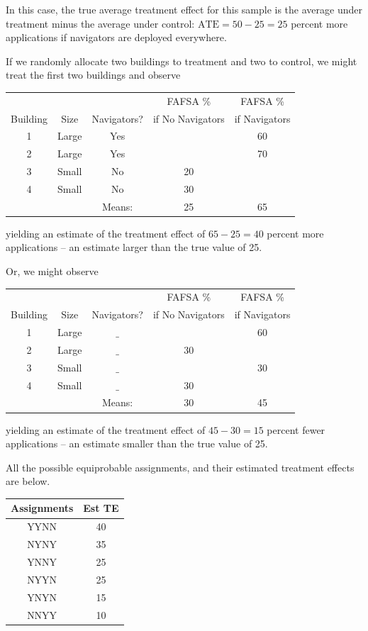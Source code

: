 \documentclass[
  12pt,
]{book}
\theoremstyle{definition}
\theoremstyle{definition}
\theoremstyle{definition}
\theoremstyle{remark}
\begin{document}
In this case, the true average treatment effect for this sample is the
average under treatment minus the average under control:
\(\text{ATE} = 50-25=25\) percent more applications if navigators are
deployed everywhere.

If we randomly allocate two buildings to treatment and two to control,
we might treat the first two buildings and observe

\begin{center}
\begin{tabular}{ccccc}
&&& FAFSA \% & FAFSA \% \\
Building & Size & Navigators? & if No Navigators & if Navigators   \\ \hline
1 & Large & Yes &  & 60 \\
2 & Large & Yes &  & 70 \\
3 & Small & No & 20 &  \\
4 & Small & No & 30 &  \\ \hline
&& Means: & 25 & 65 \\
\end{tabular}
\end{center}

yielding an estimate of the treatment effect of \(65-25 = 40\) percent
more applications -- an estimate larger than the true value of 25.

Or, we might observe

\begin{center}
\begin{tabular}{ccccc}
&&& FAFSA \% & FAFSA \% \\
Building & Size & Navigators? & if No Navigators & if Navigators   \\ \hline
1 & Large & $\_$ &  & 60 \\
2 & Large & $\_$ & 30 &  \\
3 & Small & $\_$ &  & 30 \\
4 & Small & $\_$ & 30 &  \\ \hline
&& Means: & 30 & 45 \\
\end{tabular}
\end{center}

yielding an estimate of the treatment effect of \(45-30 = 15\) percent
fewer applications -- an estimate smaller than the true value of 25.

All the possible equiprobable assignments, and their estimated treatment
effects are below.

\begin{center}
\begin{tabular}{cc}
Assignments & Est TE \\ \hline
YYNN & 40  \\ 
NYNY & 35 \\
YNNY & 25 \\
NYYN & 25 \\
YNYN & 15 \\
NNYY & 10
\end{tabular}
\end{center}
\end{document}
